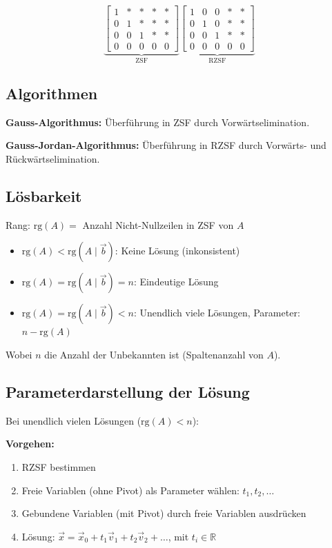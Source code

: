 \begin{equation*}
    \underbrace{\left[
            \begin{array}{cccc|c}
                1 & * & * & * & * \\
                0 & 1 & * & * & * \\
                0 & 0 & 1 & * & * \\
                0 & 0 & 0 & 0 & 0
            \end{array}
            \right]}_{\text{ZSF}}
    \underbrace{\left[
            \begin{array}{cccc|c}
                1 & 0 & 0 & * & * \\
                0 & 1 & 0 & * & * \\
                0 & 0 & 1 & * & * \\
                0 & 0 & 0 & 0 & 0
            \end{array}
            \right]}_{\text{RZSF}}
\end{equation*}

\subsection{Algorithmen}
\textbf{Gauss-Algorithmus:} Überführung in ZSF durch Vorwärtselimination.

\textbf{Gauss-Jordan-Algorithmus:} Überführung in RZSF durch Vorwärts- und Rückwärtselimination.

\subsection{Lösbarkeit}
Rang: $\text{rg}(A) = $ Anzahl Nicht-Nullzeilen in ZSF von $A$

\begin{itemize}
    \item $\text{rg}(A) < \text{rg}(A \mid \vec{b})$: Keine Lösung (inkonsistent)
    \item $\text{rg}(A) = \text{rg}(A \mid \vec{b}) = n$: Eindeutige Lösung
    \item $\text{rg}(A) = \text{rg}(A \mid \vec{b}) < n$: Unendlich viele Lösungen, Parameter: $n - \text{rg}(A)$
\end{itemize}

Wobei $n$ die Anzahl der Unbekannten ist (Spaltenanzahl von $A$).

\subsection{Parameterdarstellung der Lösung}
Bei unendlich vielen Lösungen ($\text{rg}(A) < n$):

\textbf{Vorgehen:}
\begin{enumerate}
    \item RZSF bestimmen
    \item Freie Variablen (ohne Pivot) als Parameter wählen: $t_1, t_2, \dots$
    \item Gebundene Variablen (mit Pivot) durch freie Variablen ausdrücken
    \item Lösung: $\vec{x} = \vec{x}_0 + t_1 \vec{v}_1 + t_2 \vec{v}_2 + \dots$, mit $t_i \in \mathbb{R}$
\end{enumerate}
